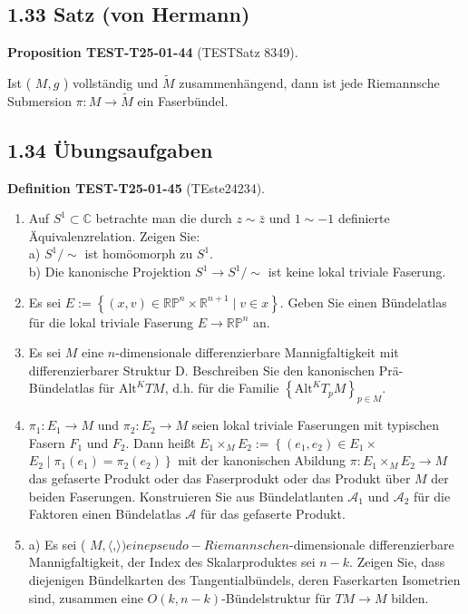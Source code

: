 \documentclass[10pt, letterpaper]{article}
\newcommand{\CustomHeading}[3]{%
  \par\medskip\noindent%
  \textbf{#1 #2} \textnormal{(#3)}.\enskip%
}
\newenvironment{DEF}[2]{\begin{unitbox}\CustomHeading{Definition}{#1}{#2}}{\end{unitbox}}
\newenvironment{PROP}[2]{\begin{unitbox}\CustomHeading{Proposition}{#1}{#2}}{\end{unitbox}}
\begin{document}
\subsection*{1.33 Satz (von Hermann)}
\begin{PROP}{TEST-T25-01-44}{TESTSatz 8349}
Ist ( $M, g$ ) vollständig und $\tilde{M}$ zusammenhängend, dann ist jede Riemannsche Submersion $\pi: M \rightarrow \tilde{M}$ ein Faserbündel.
\end{PROP}

\subsection*{1.34 Übungsaufgaben}
\begin{DEF}{TEST-T25-01-45}{TEste24234}
\begin{enumerate}
  \item Auf $S^{1} \subset \mathbb{C}$ betrachte man die durch $z \sim \bar{z}$ und $1 \sim-1$ definierte Äquivalenzrelation. Zeigen Sie:\\
a) $S^{1} / \sim$ ist homöomorph zu $S^{1}$.\\
b) Die kanonische Projektion $S^{1} \rightarrow S^{1} / \sim$ ist keine lokal triviale Faserung.
  \item Es sei $E:=\left\{(x, v) \in \mathbb{R P}^{n} \times \mathbb{R}^{n+1} \mid v \in x\right\}$. Geben Sie einen Bündelatlas für die lokal triviale Faserung $E \rightarrow \mathbb{R} \mathbb{P}^{n}$ an.
  \item Es sei $M$ eine $n$-dimensionale differenzierbare Mannigfaltigkeit mit differenzierbarer Struktur D. Beschreiben Sie den kanonischen Prä-Bündelatlas für $\mathrm{Alt}^{K} T M$, d.h. für die Familie $\left\{\mathrm{Alt}^{K} T_{p} M\right\}_{p \in M}$.
  \item $\pi_{1}: E_{1} \rightarrow M$ und $\pi_{2}: E_{2} \rightarrow M$ seien lokal triviale Faserungen mit typischen Fasern $F_{1}$ und $F_{2}$. Dann heißt $E_{1} \times_{M} E_{2}:=\left\{\left(e_{1}, e_{2}\right) \in E_{1} \times\right.$ $\left.E_{2} \mid \pi_{1}\left(e_{1}\right)=\pi_{2}\left(e_{2}\right)\right\}$ mit der kanonischen Abildung $\pi: E_{1} \times_{M} E_{2} \rightarrow M$ das gefaserte Produkt oder das Faserprodukt oder das Produkt über $M$ der beiden Faserungen. Konstruieren Sie aus Bündelatlanten $\mathcal{A}_{1}$ und $\mathcal{A}_{2}$ für die Faktoren einen Bündelatlas $\mathcal{A}$ für das gefaserte Produkt.
  \item a) Es sei ( $M,\langle$,$\rangle ) eine pseudo-Riemannsche n$-dimensionale differenzierbare Mannigfaltigkeit, der Index des Skalarproduktes sei $n-k$. Zeigen Sie, dass diejenigen Bündelkarten des Tangentialbündels, deren Faserkarten Isometrien sind, zusammen eine $O(k, n-k)$-Bündelstruktur für $T M \rightarrow M$ bilden.\\

\end{enumerate}
\end{DEF}
\end{document}
